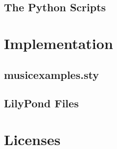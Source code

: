 \documentclass{OLLbook}
\begin{document}
\section{The Python Scripts}

\chapter{Implementation}

\section{musicexamples.sty}

\section{LilyPond Files}

\chapter{Licenses}

\end{document}
